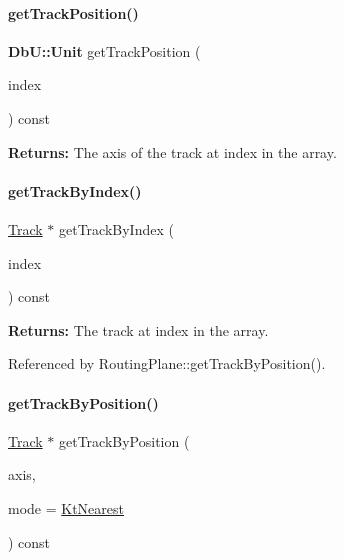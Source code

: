 \paragraph{\texorpdfstring{get\+Track\+Position()}{getTrackPosition()}}
{\footnotesize\ttfamily \textbf{ Db\+U\+::\+Unit} get\+Track\+Position (\begin{DoxyParamCaption}\item[{size\+\_\+t}]{index }\end{DoxyParamCaption}) const\hspace{0.3cm}{\ttfamily [inline]}}

{\bfseries Returns\+:} The axis of the track at {\ttfamily index} in the array. \mbox{\label{classKite_1_1RoutingPlane_a5e9defabb4cb2cb1b0f73b1dc3c677de}} 
\paragraph{\texorpdfstring{get\+Track\+By\+Index()}{getTrackByIndex()}}
{\footnotesize\ttfamily \hyperlink{classKite_1_1Track}{Track} $\ast$ get\+Track\+By\+Index (\begin{DoxyParamCaption}\item[{size\+\_\+t}]{index }\end{DoxyParamCaption}) const}

{\bfseries Returns\+:} The track at {\ttfamily index} in the array. 

Referenced by Routing\+Plane\+::get\+Track\+By\+Position().

\mbox{\label{classKite_1_1RoutingPlane_a8c464eebfa0f85d0b9f4677bb191100c}} 
\paragraph{\texorpdfstring{get\+Track\+By\+Position()}{getTrackByPosition()}}
{\footnotesize\ttfamily \hyperlink{classKite_1_1Track}{Track} $\ast$ get\+Track\+By\+Position (\begin{DoxyParamCaption}\item[{\textbf{ Db\+U\+::\+Unit}}]{axis,  }\item[{unsigned int}]{mode = {\ttfamily \hyperlink{namespaceKite_acca8fffa3182dea5f94208f454f14b47afaf04b2ddbae58557683c20373c0bada}{Kt\+Nearest}} }\end{DoxyParamCaption}) const}

